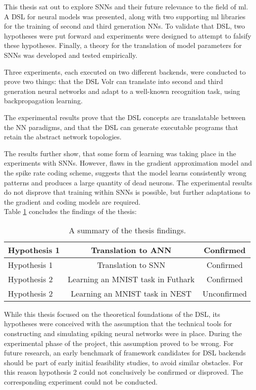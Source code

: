 \documentclass[report.tex]{subfiles}
\begin{document}
This thesis sat out to explore \glspl{SNN} and their future relevance to the field of
\gls{ml}.
A \gls{DSL} for neural models was presented, along with two
supporting \gls{ml} libraries for the training of second and third generation
\glspl{NN}. 
To validate that \gls{DSL}, two hypotheses were put forward and experiments were
designed to attempt to falsify these hypotheses.
Finally, a theory for the translation of model parameters for \glspl{SNN} was
developed and tested empirically.

Three experiments, each executed on two different backends, were conducted to
prove two things: that the \gls{DSL} Volr can translate into second and third
generation neural networks and adapt to a well-known recognition task, using
backpropagation learning.

The experimental results prove that the \gls{DSL} concepts are
translatable between the \gls{NN} paradigms, and that the \gls{DSL} can generate
executable programs that retain the abstract network topologies.

The results further show, that some form of learning was taking place in the
experiments with \glspl{SNN}.
However, flaws in the gradient approximation model and the spike rate coding
scheme, suggests that the model learns consistently wrong patterns and produces a
large quantity of dead neurons.
The experimental results do not disprove that training within \glspl{SNN} is possible,
but further adaptations to the gradient and coding models are required.
\\[0.1cm]

Table \ref{tab:findings} concludes the findings of the thesis:

\def\arraystretch{1.5}
\begin{table}
  \centering
  \begin{tabular}{l c c}
     Hypothesis 1 & Translation to \gls{ANN} & Confirmed \\ \hline
     Hypothesis 1 & Translation to \gls{SNN} & Confirmed \\ \hline
     Hypothesis 2 & Learning an MNIST task in Futhark & Confirmed \\ \hline
     Hypothesis 2 & Learning an MNIST task in NEST & Unconfirmed \\ \hline
  \end{tabular}
  \caption{A summary of the thesis findings.}
  \label{tab:findings}
\end{table}

While this thesis focused on the theoretical foundations of the DSL, its hypotheses were conceived with the assumption that the
technical tools for constructing and simulating spiking neural networks were in place.
During the experimental phase of the project, this assumption proved to be wrong.
For future research, an early benchmark of framework candidates for \gls{DSL} backends
should be part of early initial feasibility studies, to avoid similar obstacles.
For this reason hypothesis 2 could not conclusively be confirmed or disproved.
The corresponding experiment could not be conducted.
\end{document}
